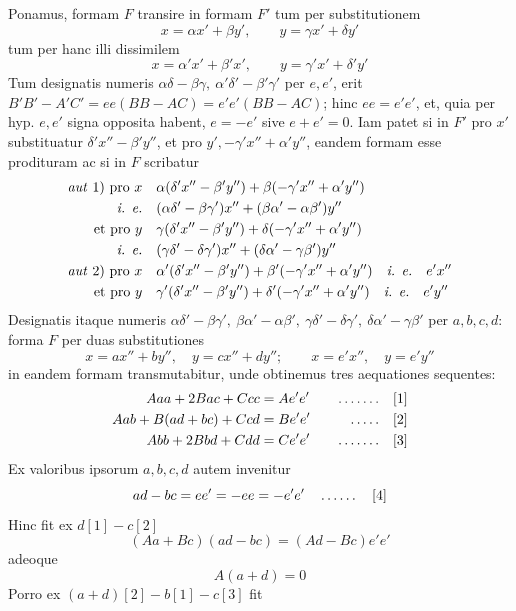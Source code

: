 Ponamus, formam \(F\) transire in formam \(F'\) tum per substitutionem
\[
x=\alpha x'+\beta y',\qquad y=\gamma x'+\delta y'
\]
tum per hanc illi dissimilem
\[
x=\alpha'x'+\beta'x',\qquad y=\gamma'x'+\delta'y'
\]
Tum designatis numeris \(\alpha\delta-\beta\gamma,\ \alpha'\delta'-\beta'\gamma'\) per \(e,e'\), erit \(B'B'-A'C'=ee(BB-AC)=e'e'(BB-AC)\); hinc \(ee=e'e'\), et, quia per hyp. \(e,e'\) signa opposita habent, \(e=-e'\) sive \(e+e'=0\). Iam patet si in \(F'\) pro \(x'\) substituatur \(\delta'x''-\beta'y''\), et pro \(y',-\gamma'x''+\alpha'y''\), eandem formam esse prodituram ac si in \(F\) scribatur
\[
\begin{aligned}
\text{\textit{aut} 1) pro }x\quad&\alpha(\delta'x''-\beta'y'')+\beta(-\gamma'x''+\alpha'y'')\\
\text{\textit{i. e.}}\quad&(\alpha\delta'-\beta\gamma')x''+(\beta\alpha'-\alpha\beta')y''\\
\text{et pro }y\quad&\gamma(\delta'x''-\beta'y'')+\delta(-\gamma'x''+\alpha'y'')\\
\text{\textit{i. e.}}\quad&(\gamma\delta'-\delta\gamma')x''+(\delta\alpha'-\gamma\beta')y''\\
\text{\textit{aut} 2) pro }x\quad&\alpha'(\delta'x''-\beta'y'')+\beta'(-\gamma'x''+\alpha'y'')\quad\text{\textit{i. e.}}\quad e'x''\\
\text{et pro }y\quad&\gamma'(\delta'x''-\beta'y'')+\delta'(-\gamma'x''+\alpha'y'')\quad\text{\textit{i. e.}}\quad e'y''
\end{aligned}
\]
Designatis itaque numeris \(\alpha\delta'-\beta\gamma',\ \beta\alpha'-\alpha\beta',\ \gamma\delta'-\delta\gamma',\ \delta\alpha'-\gamma\beta'\) per \(a,b,c,d\): forma \(F\) per duas substitutiones
\[
x=ax''+by'',\quad y=cx''+dy'';\qquad x=e'x'',\quad y=e'y''
\]
in eandem formam transmutabitur, unde obtinemus tres aequationes sequentes:
\[
\begin{aligned}
Aaa+2Bac+Ccc&=Ae'e'&\quad\mathinner{.\,.\,.\,.\,.\,.\,.}\quad&[1]\\
Aab+B(ad+bc)+Ccd&=Be'e'&\quad\mathinner{.\,.\,.\,.\,.}\quad&[2]\\
Abb+2Bbd+Cdd&=Ce'e'&\quad\mathinner{.\,.\,.\,.\,.\,.\,.}\quad&[3]
\end{aligned}
\]
Ex valoribus ipsorum \(a,b,c,d\) autem invenitur
\[
ad-bc=ee'=-ee=-e'e'\quad\mathinner{.\,.\,.\,.\,.\,.}\quad[4]
\]
Hinc fit ex \(d[1]-c[2]\)
\[
(Aa+Bc)(ad-bc)=(Ad-Bc)e'e'
\]
adeoque
\[
A(a+d)=0
\]
Porro ex \((a+d)[2]-b[1]-c[3]\) fit

